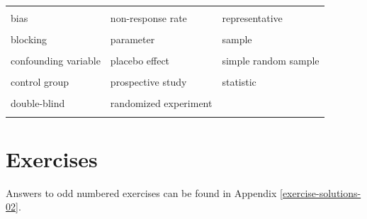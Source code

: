 \documentclass[
  10pt,
  openany]{book}
\begin{document}
\begin{tabu} to 
\toprule
{} &  & \\
bias & non-response rate & representative\\
 &  & \\
blocking & parameter & sample\\
 &  & \\
confounding variable & placebo effect & simple random sample\\
 &  & \\
control group & prospective study & statistic\\
 &  & \\
double-blind & randomized experiment & \\
 &  & \\
\bottomrule
\end{tabu}

\clearpage

\hypertarget{chp2-exercises}{%
\section{Exercises}\label{chp2-exercises}}

Answers to odd numbered exercises can be found in Appendix \ref{exercise-solutions-02}.
\end{document}
